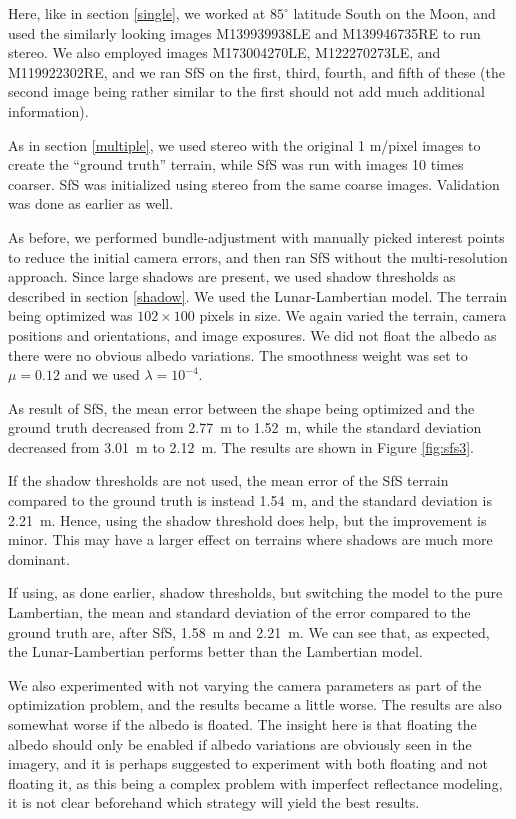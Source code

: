 \documentclass[12pt,oneside]{article}
\begin{document}
Here, like in section \ref{single}, we worked at $85^\circ$ latitude
South on the Moon, and used the similarly looking images M139939938LE
and M139946735RE to run stereo. We also employed images M173004270LE,
M122270273LE, and M119922302RE, and we ran SfS on the first, third,
fourth, and fifth of these (the second image being rather similar to the
first should not add much additional information).

As in section \ref{multiple}, we used stereo with the original 1 m/pixel
images to create the ``ground truth'' terrain, while SfS was run with
images 10 times coarser. SfS was initialized using stereo from the same
coarse images. Validation was done as earlier as well.

As before, we performed bundle-adjustment with manually picked interest
points to reduce the initial camera errors, and then ran SfS without the
multi-resolution approach. Since large shadows are present, we used
shadow thresholds as described in section \ref{shadow}. We used the
Lunar-Lambertian model. The terrain being optimized was $102 \times 100$
pixels in size. We again varied the terrain, camera positions and
orientations, and image exposures. We did not float the albedo as there
were no obvious albedo variations. The smoothness weight was set to
$\mu=0.12$ and we used $\lambda=10^{-4}.$

As result of SfS, the mean error between the shape being optimized and
the ground truth decreased from 2.77~m to 1.52~m, while the standard
deviation decreased from 3.01~m to 2.12~m. 
The results are shown in Figure \ref{fig:sfs3}.

If the shadow thresholds are not
used, the mean error of the SfS terrain compared to the ground truth
is instead 1.54~m, and the standard deviation is 2.21~m. Hence, using
the shadow threshold does help, but the improvement is minor. This may have 
a larger effect on terrains where shadows are much more dominant. 

If using, as done earlier, shadow thresholds, but switching the model to the pure Lambertian, 
the mean and standard deviation of the error compared to the ground truth are, after SfS,
1.58~m and 2.21~m. We can see that, as expected, the Lunar-Lambertian performs
better than the Lambertian model. 

We also experimented with not varying the camera parameters as part of
the optimization problem, and the results became a little worse.  The
results are also somewhat worse if the albedo is floated. The insight
here is that floating the albedo should only be enabled if albedo
variations are obviously seen in the imagery, and it is perhaps
suggested to experiment with both floating and not floating it, as this
being a complex problem with imperfect reflectance modeling, it is not
clear beforehand which strategy will yield the best results.
\end{document}
